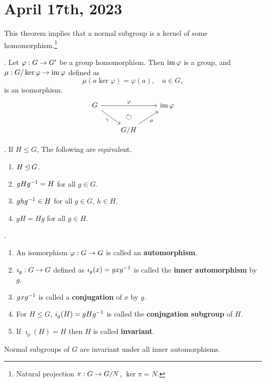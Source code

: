 \section*{April 17th, 2023}

This theorem implies that a normal subgroup is a kernel of some homomorphism.\footnote{Natural projection \(\pi : G \rightarrow G/N\), \(\ker\pi = N\).}

\thm.  Let \(\varphi : G \rightarrow G'\) be a group homomorphism. Then \(\operatorname{im} \varphi\) is a group, and \(\mu: G/\ker\varphi \rightarrow \operatorname{im} \varphi\) defined as
\[
    \mu(a \ker\varphi) = \varphi(a), \quad a \in G,
\]
is an isomorphism.
\[
    \begin{tikzcd}
        G \arrow{rr}{\varphi} \arrow[swap]{dr}{\gamma} & \arrow[d, phantom, "\circlearrowright"]& \im \varphi \\
        & G/H \arrow[swap]{ur}{\mu} &
    \end{tikzcd}
\]

\thm. If \(H \leq G\), The following are equivalent.
\begin{enumerate}
    \item \(H \unlhd G\).
    \item \(gHg^{-1} = H\) for all \(g \in G\).
    \item \(ghg^{-1} \in H\) for all \(g \in G\), \(h \in H\).
    \item \(gH = Hg\) for all \(g \in H\).
\end{enumerate}

. 
\begin{enumerate}
    \item An isomorphism \(\varphi : G \rightarrow G\) is called an \textbf{automorphism}.
    \item \(\imath_g : G \rightarrow G\) defined as \(\imath_g(x) = gxg^{-1}\) is called the \textbf{inner automorphism} by \(g\).
    \item \(gxg^{-1}\) is called a \textbf{conjugation} of \(x\) by \(g\).
    \item For \(H \leq G\), \(i_g(H) = gHg^{-1}\) is called the \textbf{conjugation subgroup} of \(H\).
    \item If \(\imath_g(H) = H\) then \(H\) is called \textbf{invariant}.
\end{enumerate}

\rmk Normal subgroups of \(G\) are invariant under all inner automorphisms.

\pagebreak



